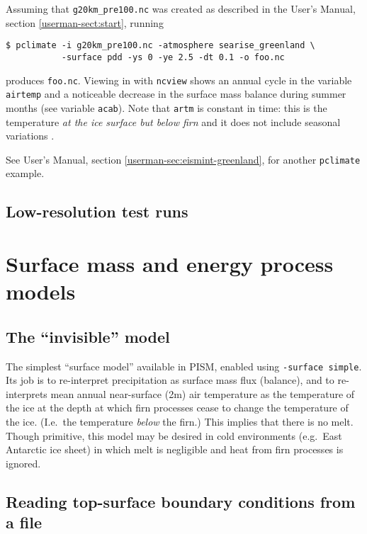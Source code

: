 \documentclass[titlepage,letterpaper,final]{scrartcl}
\def\optsection#1{%
  \def\optindex##1{\index[options]{#1!##1}}
  \def\optseealso##1{\index[options]{#1|see{##1}}}
}
\begin{document}
Assuming that \texttt{g20km_pre100.nc} was created as described in the User's Manual, section \ref*{userman-sect:start}, running
\begin{verbatim}
$ pclimate -i g20km_pre100.nc -atmosphere searise_greenland \
           -surface pdd -ys 0 -ye 2.5 -dt 0.1 -o foo.nc
\end{verbatim}%
produces \texttt{foo.nc}. Viewing in with \texttt{ncview} shows an annual cycle in the variable \texttt{airtemp} and a noticeable decrease in the surface mass balance during summer months (see variable \texttt{acab}). Note that \texttt{artm} is constant in time: this is the temperature \emph{at the ice surface but below firn} and it does not include seasonal variations \cite{Hock05}.

See User's Manual, section \ref*{userman-sec:eismint-greenland}, for another \texttt{pclimate} example.

\subsection{Low-resolution test runs}
\label{sec:low-resolution-test-runs}

\newcommand{\surface}{Surface models (\texttt{-surface})}

\section{Surface mass and energy process models}
\label{sec:surface}

\subsection{The ``invisible'' model}
\label{sec:surface-simple}
\index[options]{\surface!\texttt{simple}}

The simplest ``surface model'' available in PISM, enabled using \texttt{-surface simple}. Its job is to re-interpret precipitation as surface mass flux (balance), and to re-interprets mean annual near-surface (2m) air temperature as the temperature of the ice at the depth at which firn processes cease to change the temperature of the ice.  (I.e.~the temperature \emph{below} the firn.) This implies that there is no melt. Though primitive, this model may be desired in cold environments (e.g.~East Antarctic ice sheet) in which melt is negligible and heat from firn processes is ignored.

\subsection{Reading top-surface boundary conditions from a file}
\label{sec:surface-given}
\optsection{\surface!\texttt{given}}
\end{document}

